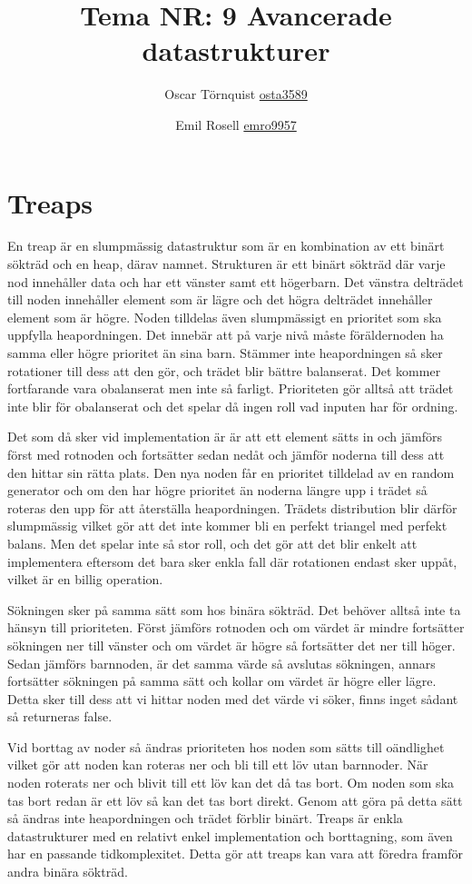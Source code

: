 \documentclass[a5paper,10pt,oneside]{article}
\title{Tema NR: 9 Avancerade datastrukturer}
\author{Oscar Törnquist \url{osta3589} \and Emil Rosell \url{emro9957}}
\begin{document}
\maketitle

\section*{Treaps}

En treap är en slumpmässig datastruktur som är en kombination av ett binärt sökträd och en heap, därav namnet. Strukturen är ett binärt sökträd där varje nod innehåller data och har ett vänster samt ett högerbarn. Det vänstra delträdet till noden innehåller element som är lägre och det högra delträdet innehåller element som är högre. Noden tilldelas även slumpmässigt en prioritet som ska uppfylla heapordningen. Det innebär att på varje nivå måste föräldernoden ha samma eller högre prioritet än sina barn. Stämmer inte heapordningen så sker rotationer till dess att den gör, och trädet blir bättre balanserat. Det kommer fortfarande vara obalanserat men inte så farligt. Prioriteten gör alltså att trädet inte blir för obalanserat och det spelar då ingen roll vad inputen har för ordning.

Det som då sker vid implementation är är att ett element sätts in och jämförs först med rotnoden och fortsätter sedan nedåt och jämför noderna till dess att den hittar sin rätta plats. Den nya noden får en prioritet tilldelad av en random generator och om den har högre prioritet än noderna längre upp i trädet så roteras den upp för att återställa heapordningen. Trädets distribution blir därför slumpmässig vilket gör att det inte kommer bli en perfekt triangel med perfekt balans. Men det spelar inte så stor roll, och det gör att det blir enkelt att implementera eftersom det bara sker enkla fall där rotationen endast sker uppåt, vilket är en billig operation. 

Sökningen sker på samma sätt som hos binära sökträd. Det behöver alltså inte ta hänsyn till prioriteten. Först jämförs rotnoden och om värdet är mindre fortsätter sökningen ner till vänster och om värdet är högre så fortsätter det ner till höger. Sedan jämförs barnnoden, är det samma värde så avslutas sökningen, annars fortsätter sökningen på samma sätt och kollar om värdet är högre eller lägre. Detta sker till dess att vi hittar noden med det värde vi söker, finns inget sådant så returneras false.

Vid borttag av noder så ändras prioriteten hos noden som sätts till oändlighet vilket gör att noden kan roteras ner och bli till ett löv utan barnnoder. När noden roterats ner och blivit till ett löv kan det då tas bort. Om noden som ska tas bort redan är ett löv så kan det tas bort direkt. Genom att göra på detta sätt så ändras inte heapordningen och trädet förblir binärt. Treaps är enkla datastrukturer med en relativt enkel implementation och borttagning, som även har en passande tidkomplexitet. Detta gör att treaps kan vara att föredra framför andra binära sökträd.  
\end{document}

